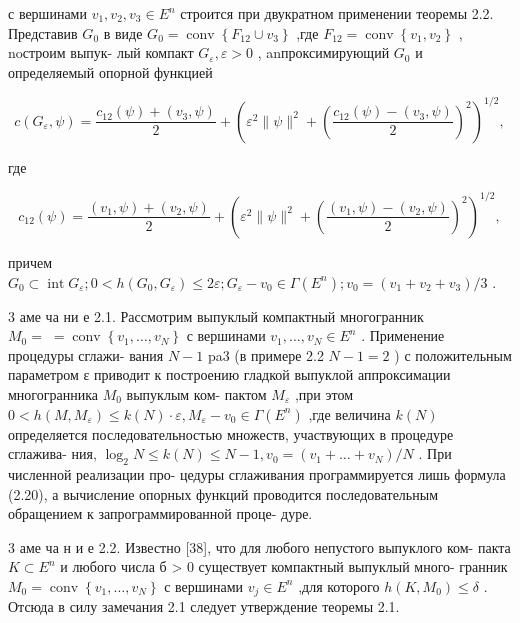 \documentclass[10pt]{article}
\begin{document}
с вершинами \({v}_{1},{v}_{2},{v}_{3} \in  {E}^{n}\) строится при двукратном применении теоремы 2.2. Представив \({G}_{0}\) в виде \({G}_{0} = \operatorname{conv}\left\{  {{F}_{12} \cup  {v}_{3}}\right\}\) ,где \({F}_{12} = \operatorname{conv}\left\{  {{v}_{1},{v}_{2}}\right\}\) , noстроим выпук- лый компакт \({G}_{\varepsilon },\varepsilon  > 0\) , anпроксимирующий \({G}_{0}\) и определяемый опорной функцией

\[
c\left( {{G}_{\varepsilon },\psi }\right)  = \frac{{c}_{12}\left( \psi \right)  + \left( {{v}_{3},\psi }\right) }{2} + {\left( {\varepsilon }^{2}\parallel \psi {\parallel }^{2} + {\left( \frac{{c}_{12}\left( \psi \right)  - \left( {{v}_{3},\psi }\right) }{2}\right) }^{2}\right) }^{1/2},
\]

где

\[
{c}_{12}\left( \psi \right)  = \frac{\left( {{v}_{1},\psi }\right)  + \left( {{v}_{2},\psi }\right) }{2} + {\left( {\varepsilon }^{2}\parallel \psi {\parallel }^{2} + {\left( \frac{\left( {{v}_{1},\psi }\right)  - \left( {{v}_{2},\psi }\right) }{2}\right) }^{2}\right) }^{1/2},
\]

причем \({G}_{0} \subset  \operatorname{int}{G}_{\varepsilon };0 < h\left( {{G}_{0},{G}_{\varepsilon }}\right)  \leq  {2\varepsilon };{G}_{\varepsilon } - {v}_{0} \in  \Gamma \left( {E}^{n}\right) ;{v}_{0} = \left( {{v}_{1} + {v}_{2} + {v}_{3}}\right) /3\) .

3 аме ча ни е 2.1. Рассмотрим выпуклый компактный многогранник \({M}_{0} = \; = \operatorname{conv}\left\{  {{v}_{1},\ldots ,{v}_{N}}\right\}\) с вершинами \({v}_{1},\ldots ,{v}_{N} \in  {E}^{n}\) . Применение процедуры сглажи- вания \(N - 1\) pa3 (в примере 2.2 \(N - 1 = 2\) ) с положительным параметром ε приводит к построению гладкой выпуклой аппроксимации многогранника \({M}_{0}\) выпуклым ком- пактом \({M}_{\varepsilon }\) ,при этом \(0 < h\left( {M,{M}_{\varepsilon }}\right)  \leq  k\left( N\right)  \cdot  \varepsilon ,{M}_{\varepsilon } - {v}_{0} \in  \Gamma \left( {E}^{n}\right)\) ,где величина \(k\left( N\right)\) определяется последовательностью множеств, участвующих в процедуре сглажива- ния, \({\log }_{2}N \leq  k\left( N\right)  \leq  N - 1,{v}_{0} = \left( {{v}_{1} + \ldots  + {v}_{N}}\right) /N\) . При численной реализации про- цедуры сглаживания программируется лишь формула (2.20), а вычисление опорных функций проводится последовательным обращением к запрограммированной проце- дуре.

3 аме ча н и е 2.2. Известно [38], что для любого непустого выпуклого ком- пакта \(K \subset  {E}^{n}\) и любого числа б > 0 существует компактный выпуклый много- гранник \({M}_{0} = \operatorname{conv}\left\{  {{v}_{1},\ldots ,{v}_{N}}\right\}\) с вершинами \({v}_{j} \in  {E}^{n}\) ,для которого \(h\left( {K,{M}_{0}}\right)  \leq  \delta\) . Отсюда в силу замечания 2.1 следует утверждение теоремы 2.1.
\end{document}
